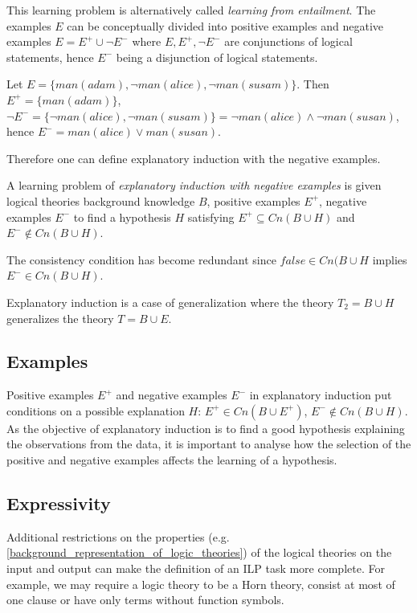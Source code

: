 This learning problem is alternatively called \emph{learning from entailment}\cite{muggleton1995inverse}\cite{de1997logical}. The examples $E$ can be conceptually divided into positive examples and negative examples $E=E^{+} \cup \neg E^{-}$ where $E, E^{+}, \neg E^{-}$ are conjunctions of logical statements, hence $E^{-}$ being a disjunction of logical statements.

\begin{exmp}\cite{explanatory_induction_example}
Let $E=\{man(adam), \neg man(alice), \neg man(susam)\}$. Then $E^{+}=\{man(adam)\}$,
$\neg E^{-} = \{\neg man(alice), \neg man(susam)\}=\neg man(alice) \land \neg man(susan)$, hence
$E^{-} = man(alice) \lor man(susan)$.
\end{exmp}

Therefore one can define explanatory induction with the negative examples.
\begin{defn}\label{explanatory_induction_with_negative_examples_definition}
A learning problem of \emph{explanatory induction with negative examples} is given logical theories background knowledge $B$, positive examples $E^{+}$, negative examples $E^{-}$ to find a hypothesis $H$ satisfying
$E^{+} \subseteq Cn(B \cup H)$ and $E^{-} \not\in Cn(B \cup H)$.
\end{defn}
The consistency condition has become redundant since $false \in Cn(B \cup H$ implies $E^{-} \in Cn(B \cup H)$.

Explanatory induction is a case of generalization where the theory $T_2=B \cup H$ generalizes the theory $T = B \cup E$.

\subsection{Examples}
Positive examples $E^{+}$ and negative examples $E^{-}$ in explanatory induction put conditions on a possible explanation $H$: $E^{+} \in Cn(B \cup E^{+})$, $E^{-} \not \in Cn(B \cup H)$. As the objective of explanatory induction is to find a good hypothesis explaining the observations from the data, it is important to analyse how the selection of the positive and negative examples affects the learning of a hypothesis.

\subsection{Expressivity}
Additional restrictions on the properties (e.g. \ref{background_representation_of_logic_theories}) of the logical theories on the input and output can make the definition of an ILP task more complete. For example, we may require a logic theory to be a Horn theory, consist at most of one clause or have only terms without function symbols.

